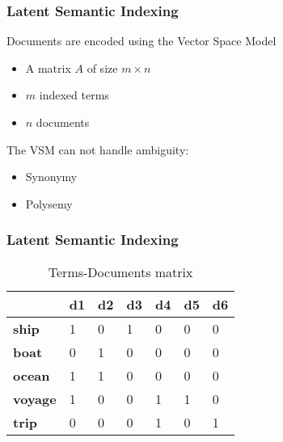 \begin{frame}[plain]
  \frametitle{Latent Semantic Indexing}
  \begin{block}{}
  Documents are encoded using the Vector Space Model 
  \begin{itemize}
    \item A matrix $A$ of size $m \times n$
    \item $m$ indexed terms
    \item $n$ documents
  \end{itemize}
  \end{block} 

  \begin{block}{}
    The VSM can not handle ambiguity:
    \begin{itemize}
    \item Synonymy
    \item Polysemy
    \end{itemize}
  \end{block} 
\end{frame}
	\begin{frame}[plain]
	 	\frametitle{Latent Semantic Indexing}
		\begin{block}{}
\begin{table}[]
\centering
\begin{tabular}{|l|l|l|l|l|l|l|}
\hline
             & {\bf d1} & {\bf d2} & {\bf d3} & {\bf d4} & {\bf d5} & {\bf d6} \\ \hline
{\bf ship}   & 1        & 0        & 1        & 0        & 0        & 0        \\ \hline
{\bf boat}   & 0        & 1        & 0        & 0        & 0        & 0        \\ \hline
{\bf ocean}  & 1        & 1        & 0        & 0        & 0        & 0        \\ \hline
{\bf voyage} & 1        & 0        & 0        & 1        & 1        & 0        \\ \hline
{\bf trip}   & 0        & 0        & 0        & 1        & 0        & 1        \\ \hline
\end{tabular}
\caption{Terms-Documents matrix }
\label{table:example00}
\end{table}
		\end{block} 
	\end{frame}
